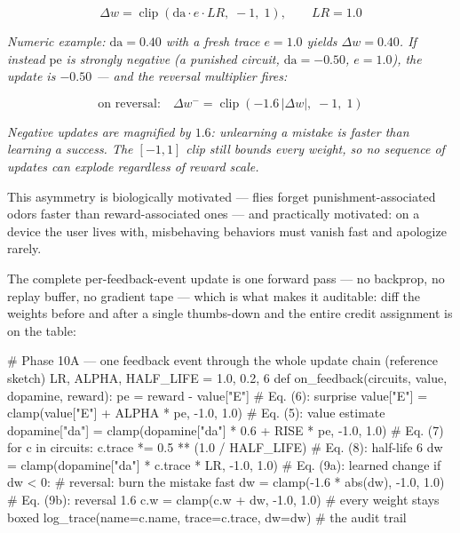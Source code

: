 \documentclass[11pt]{article}
\begin{document}
\begin{equation}
\Delta w = \operatorname{clip}(\mathrm{da}\cdot e\cdot LR,\; -1,\; 1), \qquad LR = 1.0
\tag{9a}
\end{equation}

\noindent\emph{Numeric example: \(\mathrm{da} = 0.40\) with a fresh trace \(e = 1.0\) yields \(\Delta w = 0.40\). If instead \(\mathrm{pe}\) is strongly negative (a punished circuit, \(\mathrm{da} = -0.50\), \(e = 1.0\)), the update is \(-0.50\) — and the \emph{reversal multiplier} fires:}

\begin{equation}
\text{on reversal:}\quad \Delta w^- = \operatorname{clip}(-1.6\,|\Delta w|,\; -1,\; 1)
\tag{9b}
\end{equation}

\noindent\emph{Negative updates are magnified by \(1.6\): unlearning a mistake is faster than learning a success. The \([-1, 1]\) clip still bounds every weight, so no sequence of updates can explode regardless of reward scale.}

This asymmetry is biologically motivated — flies forget punishment-associated odors faster than reward-associated ones — and practically motivated: on a device the user lives with, misbehaving behaviors must vanish fast and apologize rarely.

The complete per-feedback-event update is one forward pass — no backprop, no replay buffer, no gradient tape — which is what makes it auditable: diff the weights before and after a single thumbs-down and the entire credit assignment is on the table:

\begin{CodeBlock}
# Phase 10A — one feedback event through the whole update chain (reference sketch)
LR, ALPHA, HALF_LIFE = 1.0, 0.2, 6
def on_feedback(circuits, value, dopamine, reward):
    pe = reward - value["E"]                                # Eq. (6): surprise
    value["E"] = clamp(value["E"] + ALPHA * pe, -1.0, 1.0)  # Eq. (5): value estimate
    dopamine["da"] = clamp(dopamine["da"] * 0.6 + RISE * pe, -1.0, 1.0)  # Eq. (7)
    for c in circuits:
        c.trace *= 0.5 ** (1.0 / HALF_LIFE)                 # Eq. (8): half-life 6
        dw = clamp(dopamine["da"] * c.trace * LR, -1.0, 1.0)  # Eq. (9a): learned change
        if dw < 0:                                          # reversal: burn the mistake fast
            dw = clamp(-1.6 * abs(dw), -1.0, 1.0)            # Eq. (9b): reversal 1.6
        c.w = clamp(c.w + dw, -1.0, 1.0)                    # every weight stays boxed
        log_trace(name=c.name, trace=c.trace, dw=dw)        # the audit trail
\end{CodeBlock}
\end{document}
